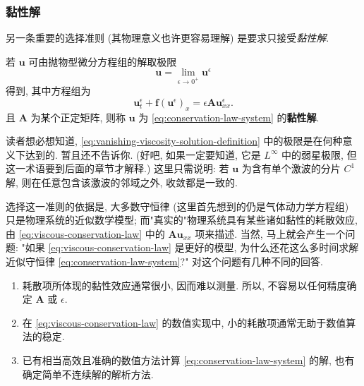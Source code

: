\subsubsection{黏性解}\label{subsec:viscosity-solutions}

另一条重要的选择准则 (其物理意义也许更容易理解) 是要求只接受\emph{黏性解}.

\begin{Definition}
\label{def:viscosity-solution}
若 $\bm{u}$ 可由抛物型微分方程组的解取极限
\begin{equation}\label{eq:vanishing-viscosity-solution-definition}
\bm{u}=\lim_{\epsilon\to0^+}\bm{u}^\epsilon
\end{equation}
得到, 其中方程组为
\begin{equation}\label{eq:viscous-conservation-law}
\bm{u}_t^\epsilon+\bm{f}(\bm{u}^\epsilon)_x=\epsilon\bm{A}\bm{u}_{xx}^\epsilon.
\end{equation}
且 $\bm{A}$ 为某个正定矩阵, 则称 $\bm{u}$ 为 \eqref{eq:conservation-law-system} 的\textbf{黏性解}.
\end{Definition}

\begin{Remark}
\label{rem:viscosity-limit-sense}
读者想必想知道, \eqref{eq:vanishing-viscosity-solution-definition} 中的极限是在何种意义下达到的. 暂且还不告诉你. (好吧, 如果一定要知道, 它是 $L^\infty$ 中的弱星极限, 但这一术语要到后面的章节才解释.) 这里只需说明: 若 $\bm{u}$ 为含有单个激波的分片 $C^1$ 解, 则在任意包含该激波的邻域之外, 收敛都是一致的.
\end{Remark}

选择这一准则的依据是, 大多数守恒律 (这里首先想到的仍是气体动力学方程组) 只是物理系统的近似数学模型; 而"真实的"物理系统具有某些诸如黏性的耗散效应, 由 \eqref{eq:viscous-conservation-law} 中的 $\bm{A}\bm{u}_{xx}$ 项来描述. 当然, 马上就会产生一个问题: "如果 \eqref{eq:viscous-conservation-law} 是更好的模型, 为什么还花这么多时间求解近似守恒律 \eqref{eq:conservation-law-system}?" 对这个问题有几种不同的回答.

\begin{enumerate}
\item 耗散项所体现的黏性效应通常很小, 因而难以测量. 所以, 不容易以任何精度确定 $\bm{A}$ 或 $\epsilon$.
\item 在 \eqref{eq:viscous-conservation-law} 的数值实现中, 小的耗散项通常无助于数值算法的稳定.
\item 已有相当高效且准确的数值方法计算 \eqref{eq:conservation-law-system} 的解, 也有确定简单不连续解的解析方法.
\end{enumerate}


